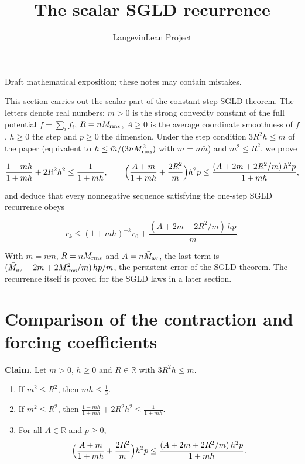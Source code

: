 \documentclass[11pt,a4paper]{article}
\title{\texorpdfstring{The scalar SGLD recurrence}{The scalar SGLD recurrence}}
\author{LangevinLean Project}
\date{}
\begin{document}
\maketitle
Draft mathematical exposition; these notes may contain mistakes.


This section carries out the scalar part of the constant-step SGLD theorem. The letters denote real numbers: \(m>0\) is the strong convexity constant of the full potential \(f=\sum_if_i\), \(R=nM_{\rm rms}\), \(A\ge0\) is the average coordinate smoothness of \(f\), \(h\ge0\) the step and \(p\ge0\) the dimension. Under the step condition \(3R^2h\le m\) of the paper (equivalent to \(h\le\bar m/(3nM_{\rm rms}^2)\) with \(m=n\bar m\)) and \(m^2\le R^2\), we prove


\[\frac{1-mh}{1+mh}+2R^2h^2\le\frac1{1+mh},\qquad\Bigl(\frac{A+m}{1+mh}+\frac{2R^2}m\Bigr)h^2p\le\frac{(A+2m+2R^2/m)\,h^2p}{1+mh},\]


and deduce that every nonnegative sequence satisfying the one-step SGLD recurrence obeys


\[r_k\le(1+mh)^{-k}r_0+\frac{(A+2m+2R^2/m)\,hp}{m}.\]


With \(m=n\bar m\), \(R=nM_{\rm rms}\) and \(A=n\bar M_{\rm av}\), the last term is \((\bar M_{\rm av}+2\bar m+2M_{\rm rms}^2/\bar m)\,hp/\bar m\), the persistent error of the SGLD theorem. The recurrence itself is proved for the SGLD laws in a later section.


\section{\texorpdfstring{Comparison of the contraction and forcing coefficients}{Comparison of the contraction and forcing coefficients}}


\textbf{Claim.} Let \(m>0\), \(h\ge0\) and \(R\in\mathbb R\) with \(3R^2h\le m\).



\begin{enumerate}


\item If \(m^2\le R^2\), then \(mh\le\frac13\).

\item If \(m^2\le R^2\), then \(\displaystyle\frac{1-mh}{1+mh}+2R^2h^2\le\frac1{1+mh}\).

\item For all \(A\in\mathbb R\) and \(p\ge0\),
\[\Bigl(\frac{A+m}{1+mh}+\frac{2R^2}m\Bigr)h^2p\le\frac{(A+2m+2R^2/m)\,h^2p}{1+mh}.\]

\end{enumerate}
\end{document}
